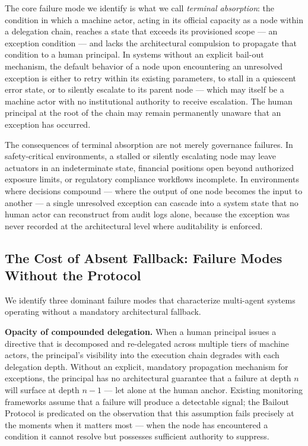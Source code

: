 The core failure mode we identify is what we call \emph{terminal absorption}: the condition in which a machine actor, acting in its official capacity as a node within a delegation chain, reaches a state that exceeds its provisioned scope — an exception condition — and lacks the architectural compulsion to propagate that condition to a human principal. In systems without an explicit bail-out mechanism, the default behavior of a node upon encountering an unresolved exception is either to retry within its existing parameters, to stall in a quiescent error state, or to silently escalate to its parent node — which may itself be a machine actor with no institutional authority to receive escalation. The human principal at the root of the chain may remain permanently unaware that an exception has occurred.

The consequences of terminal absorption are not merely governance failures. In safety-critical environments, a stalled or silently escalating node may leave actuators in an indeterminate state, financial positions open beyond authorized exposure limits, or regulatory compliance workflows incomplete. In environments where decisions compound — where the output of one node becomes the input to another — a single unresolved exception can cascade into a system state that no human actor can reconstruct from audit logs alone, because the exception was never recorded at the architectural level where auditability is enforced.

\subsection{The Cost of Absent Fallback: Failure Modes Without the Protocol}\label{sec:failure-modes}

We identify three dominant failure modes that characterize multi-agent systems operating without a mandatory architectural fallback.

\textbf{Opacity of compounded delegation.} When a human principal issues a directive that is decomposed and re-delegated across multiple tiers of machine actors, the principal's visibility into the execution chain degrades with each delegation depth. Without an explicit, mandatory propagation mechanism for exceptions, the principal has no architectural guarantee that a failure at depth $n$ will surface at depth $n-1$ — let alone at the human anchor. Existing monitoring frameworks assume that a failure will produce a detectable signal; the Bailout Protocol is predicated on the observation that this assumption fails precisely at the moments when it matters most — when the node has encountered a condition it cannot resolve but possesses sufficient authority to suppress.

